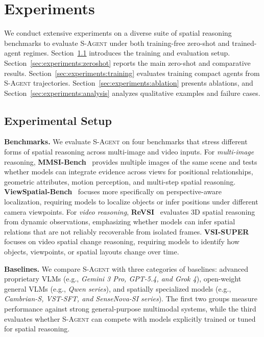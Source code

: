 \section{Experiments}
\label{sec:experiments}
We conduct extensive experiments on a diverse suite of spatial reasoning benchmarks to evaluate \textsc{S-Agent} under both training-free zero-shot and trained-agent regimes. 
Section~\ref{sec:experiments:setup} introduces the training and evaluation setup. 
Section~\ref{sec:experiments:zeroshot} reports the main zero-shot and comparative results. 
Section~\ref{sec:experiments:training} evaluates training compact agents from \textsc{S-Agent} trajectories. 
Section~\ref{sec:experiments:ablation} presents ablations, and Section~\ref{sec:experiments:analysis} analyzes qualitative examples and failure cases.



\subsection{Experimental Setup}
\label{sec:experiments:setup}
\textbf{Benchmarks.}
We evaluate \textsc{S-Agent} on four benchmarks that stress different forms of spatial reasoning across multi-image and video inputs. 
% 
For \textit{multi-image} reasoning, \textbf{MMSI-Bench}~\citep{mmsi_bench} provides multiple images of the same scene and tests whether models can integrate evidence across views for positional relationships, geometric attributes, motion perception, and multi-step spatial reasoning. 
\textbf{ViewSpatial-Bench}~\citep{viewspatial_bench} focuses more specifically on perspective-aware localization, requiring models to localize objects or infer positions under different camera viewpoints. 
% 
For \textit{video reasoning}, \textbf{ReVSI}~\citep{revsi} evaluates 3D spatial reasoning from dynamic observations, emphasizing whether models can infer spatial relations that are not reliably recoverable from isolated frames. 
\textbf{VSI-SUPER}~\citep{cambrian_s} focuses on video spatial change reasoning, requiring models to identify how objects, viewpoints, or spatial layouts change over time.



\textbf{Baselines.}
We compare \textsc{S-Agent} with three categories of baselines: advanced proprietary VLMs (e.g., \textit{Gemini 3 Pro, GPT-5.4, and Grok 4}), open-weight general VLMs (e.g., \textit{Qwen series}), and spatially specialized models (e.g., \textit{Cambrian-S, VST-SFT, and SenseNova-SI series}). 
The first two groups measure performance against strong general-purpose multimodal systems, while the third evaluates whether \textsc{S-Agent} can compete with models explicitly trained or tuned for spatial reasoning.

